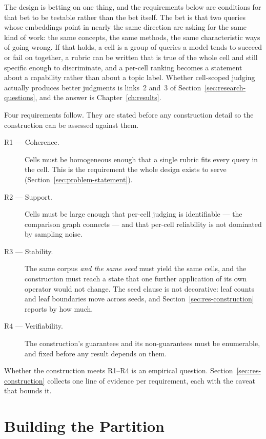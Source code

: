 The design is betting on one thing, and the requirements below are
conditions for that bet to be testable rather than the bet itself. The
bet is that two queries whose embeddings point in nearly the same
direction are asking for the same kind of work: the same concepts, the
same methods, the same characteristic ways of going wrong. If that
holds, a cell is a group of queries a model tends to succeed or fail on
together, a rubric can be written that is true of the whole cell and
still specific enough to discriminate, and a per-cell ranking becomes a
statement about a capability rather than about a topic label. Whether
cell-scoped judging actually produces better judgments is links~2 and~3
of Section~\ref{sec:research-questions}, and the answer is
Chapter~\ref{ch:results}.

Four requirements follow. They are stated before any construction
detail so the construction can be assessed against them.

\begin{description}
\item[R1 --- Coherence.] Cells must be homogeneous enough that a single
rubric fits every query in the cell. This is the requirement the whole
design exists to serve (Section~\ref{sec:problem-statement}).
\item[R2 --- Support.] Cells must be large enough that per-cell judging
is identifiable --- the comparison graph connects --- and that per-cell
reliability is not dominated by sampling noise.
\item[R3 --- Stability.] The same corpus \emph{and the same seed} must
yield the same cells, and the construction must reach a state that one
further application of its own operator would not change. The seed
clause is not decorative: leaf counts and leaf boundaries move across
seeds, and Section~\ref{sec:res-construction} reports by how much.
\item[R4 --- Verifiability.] The construction's guarantees and its
non-guarantees must be enumerable, and fixed before any result depends
on them.
\end{description}

Whether the construction meets R1--R4 is an empirical question.
Section~\ref{sec:res-construction} collects one line of evidence per
requirement, each with the caveat that bounds it.

\section{Building the Partition}\label{sec:arch-taxonomy}

